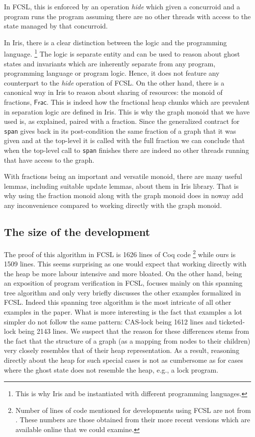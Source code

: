 \documentclass[]{scrartcl}
\def\MyMLe{\lstinline[language=MyML, basicstyle=\small\ttfamily, mathescape=true]}
\newcommand{\Frac}{\textsf{Frac}}
\begin{document}
In FCSL, this is enforced by an operation \textit{hide} which given a
concurroid and a program runs the program assuming there are no
other threads with access to the state managed by that concurroid.

In Iris, there is a clear distinction between the logic and the programming language.%
\footnote{This is why Iris and be instantiated with different programming languages.}
The logic is separate entity and can be used to reason about ghost states and invariants
which are inherently separate from any program, programming language or program logic.
Hence, it does not feature any counterpart to the \textit{hide} operation of FCSL.
On the other hand, there is a canonical way in Iris to reason about sharing of resources:
the monoid of fractions, $\Frac$.
This is indeed how the fractional heap chunks which are prevalent in separation logic are
defined in Iris.
This is why the graph monoid that we have used is, as explained, paired with a fraction.
Since the generalized contract for \MyMLe|span| gives back in its
post-condition the same fraction of a graph that it was given and at
the top-level it is called with the full fraction we can conclude that
when the top-level call to \MyMLe|span| finishes there are indeed no
other threads running that have access to the graph.

With fractions being an important and versatile monoid, there are many useful lemmas,
including suitable update lemmas, about them in Iris library.
That is why using the fraction monoid along with the graph monoid does in noway add any inconvenience compared to working directly with the graph monoid.

\subsection{The size of the development}
The proof of this algorithm in FCSL is 1626 lines of Coq code%
\footnote{Number of lines of code mentioned for developments using FCSL are not from
\cite{Sergey:2015:MVF:2737924.2737964}.
These numbers are those obtained from their more recent versions which are available online that we could examine.}
while ours is 1509 lines.
This seems surprising as one would expect that working directly with the heap be more
labour intensive and more bloated.
On the other hand, \cite{Sergey:2015:MVF:2737924.2737964} being an exposition of
program verification in FCSL, focuses mainly on this spanning tree algorithm and
only very briefly discusses the other examples formalized in FCSL.
Indeed this spanning tree algorithm is the most intricate of all other examples in the paper.
What is more interesting is the fact that examples a lot simpler do not follow the same pattern:
CAS-lock being 1612 lines and ticketed-lock being 2143 lines.
We suspect that the reason for these differences stems from the fact that the structure of
a graph (as a mapping from nodes to their children) very closely resembles that of their heap
representation.
As a result, reasoning directly about the heap for such special cases is not as cumbersome
as for cases where the ghost state does not resemble the heap, e.g., a lock program.
\end{document}
